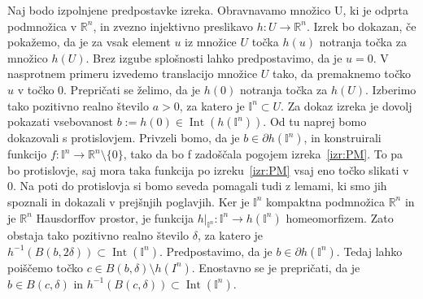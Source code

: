 \documentclass[mat1]{fmfdelo}
\newcommand{\R}{\mathbb R}
\DeclareMathOperator{\Int}{Int}
\newcommand{\I}{\mathbb I}
\newcommand{\0}{0}
\begin{document}
\begin{dokaz}
Naj bodo izpolnjene predpostavke izreka. Obravnavamo množico U, ki je odprta podmnožica v $\R^n$, in zvezno injektivno preslikavo $h : U \rightarrow \R^n$. Izrek bo dokazan, če pokažemo, da je za vsak element $u$ iz množice $U$ točka $h(u)$ notranja točka za množico $h(U)$. Brez izgube splošnosti lahko predpostavimo, da je $u=0$. V nasprotnem primeru izvedemo translacijo množice $U$ tako, da premaknemo točko $u$ v točko $0$.
Prepričati se želimo, da je $h(\0)$ notranja točka za $h(U)$. Izberimo tako pozitivno realno število $a > 0$, za katero je $\I^n \subset U$. Za dokaz izreka je dovolj pokazati vsebovanost $b := h(\0) \in \Int(h(\I^n))$. Od tu naprej bomo dokazovali s protislovjem. Privzeli bomo, da je $b \in \partial h(\I^n)$, in konstruirali funkcijo $f : \I^n \to \R^n \setminus \{ \0 \}$, tako da bo f zadoščala pogojem izreka~\ref{izr:PM}. To pa bo protislovje, saj mora taka funkcija po izreku~\ref{izr:PM} vsaj eno točko slikati v $0$. Na poti do protislovja si bomo seveda pomagali tudi z lemami, ki smo jih spoznali in dokazali v prejšnjih poglavjih. Ker je $\I^n$ kompaktna podmnožica $\R^n$ in je $\R^n$ Hausdorffov prostor, je funkcija $h|_{\I^n} : \I^n \to h\left(\I^n  \right)$ homeomorfizem. Zato obstaja tako pozitivno realno število $\delta$, za katero je $h^{-1}(B(b, 2 \delta)) \subset \Int(\I^n)$. Predpostavimo, da je $b \in \partial h\left(\I^n\right)$. Tedaj lahko poiščemo točko $c \in B(b, \delta) \setminus h(I^n)$. Enostavno se je prepričati, da je $b \in B(c, \delta)$ in $h^{-1} (B(c, \delta)) \subset \Int (\I^n)$.


\end{dokaz}
\end{document}
